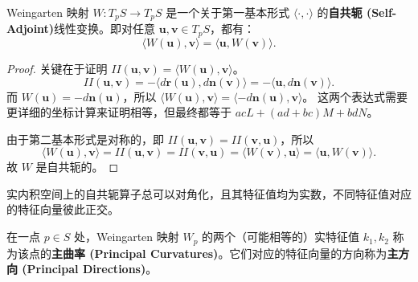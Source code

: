 \documentclass[lang=cn,10pt,thmcnt=section]{elegantbook}
\renewcommand{\vec}[1]{\mathbf{#1}}
\begin{document}
\begin{proposition}
    Weingarten 映射 $W: T_pS \to T_pS$ 是一个关于第一基本形式 $\langle \cdot, \cdot \rangle$ 的\textbf{自共轭 (Self-Adjoint)}线性变换。即对任意 $\vec{u}, \vec{v} \in T_pS$，都有：
    \[
    \langle W(\vec{u}), \vec{v} \rangle = \langle \vec{u}, W(\vec{v}) \rangle.
    \]
\end{proposition}
\begin{proof}
    关键在于证明 $II(\vec{u}, \vec{v}) = \langle W(\vec{u}), \vec{v} \rangle$。
    \[
    II(\vec{u}, \vec{v}) = -\langle d\vec{r}(\vec{u}), d\vec{n}(\vec{v}) \rangle = -\langle \vec{u}, d\vec{n}(\vec{v}) \rangle.
    \]
    而 $W(\vec{u}) = -d\vec{n}(\vec{u})$，所以 $\langle W(\vec{u}), \vec{v} \rangle = \langle -d\vec{n}(\vec{u}), \vec{v} \rangle$。
    这两个表达式需要更详细的坐标计算来证明相等，但最终都等于 $acL + (ad+bc)M + bdN$。
    
    由于第二基本形式是对称的，即 $II(\vec{u}, \vec{v}) = II(\vec{v}, \vec{u})$，所以
    \[
    \langle W(\vec{u}), \vec{v} \rangle = II(\vec{u}, \vec{v}) = II(\vec{v}, \vec{u}) = \langle W(\vec{v}), \vec{u} \rangle = \langle \vec{u}, W(\vec{v}) \rangle.
    \]
    故 $W$ 是自共轭的。
\end{proof}

\begin{remark}
    实内积空间上的自共轭算子总可以对角化，且其特征值均为实数，不同特征值对应的特征向量彼此正交。
\end{remark}

\begin{definition}[主曲率与主方向]
    在一点 $p \in S$ 处，Weingarten 映射 $W_p$ 的两个（可能相等的）实特征值 $k_1, k_2$ 称为该点的\textbf{主曲率 (Principal Curvatures)}。它们对应的特征向量的方向称为\textbf{主方向 (Principal Directions)}。
\end{definition}
\end{document}
